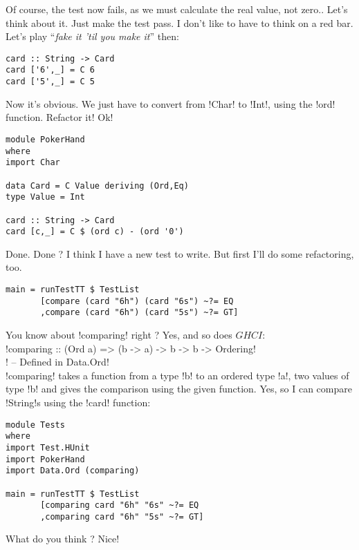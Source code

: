 \failure Of course, the test now fails, as we must calculate the real value, not zero.. Let's think about it.
\lhN \failure Just make the test pass. I don't like to have to think on a red bar.
\lhA \failure Let's play ``\emph{fake it 'til you make it}'' then:
\begin{lstlisting}[frame=single]
card :: String -> Card
card ['6',_] = C 6
card ['5',_] = C 5 
\end{lstlisting}
\success Now it's obvious.
\lhN \success We just have to convert from \il!Char! to \il!Int!, using the \il!ord! function. Refactor it!
\lhA \success Ok!
\begin{lstlisting}[frame=single]
module PokerHand
where
import Char

data Card = C Value deriving (Ord,Eq)
type Value = Int

card :: String -> Card
card [c,_] = C $ (ord c) - (ord '0')
\end{lstlisting} %
\success Done.
\lhN Done ? I think I have a new test to write. But first I'll do some refactoring, too.
\begin{lstlisting}[frame=single]
main = runTestTT $ TestList 
       [compare (card "6h") (card "6s") ~?= EQ
       ,compare (card "6h") (card "5s") ~?= GT]
\end{lstlisting} %
You know about \il!comparing! right ?
\lhA Yes, and so does $GHCI$: \\

\il!comparing :: (Ord a) => (b -> a) -> b -> b -> Ordering! \\
\il! -- Defined in Data.Ord! \\


\il!comparing! takes a function from a type \il!b! to an ordered type \il!a!, two values of type \il!b! and gives the comparison using the given function.
\lhN Yes, so I can compare \il!String!s using the \il!card! function:
\begin{lstlisting}[frame=single]
module Tests
where 
import Test.HUnit
import PokerHand
import Data.Ord (comparing)

main = runTestTT $ TestList 
       [comparing card "6h" "6s" ~?= EQ
       ,comparing card "6h" "5s" ~?= GT]
\end{lstlisting} 
\success What do you think ?
\lhA \success Nice!


\lhend